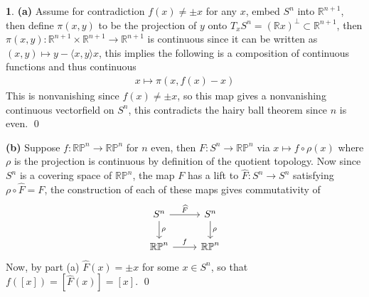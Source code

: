 \documentclass[10.5pt]{article}
\theoremstyle{definition}
\newtheorem{pb}{}
\newcommand{\gen}[1]{\langle#1\rangle}
\begin{document}
    \begin{pb}
        \textbf{(a)} Assume for contradiction \(f(x) \neq \pm x\) for any \(x\), embed \(S^n\) into \(\mathbb{R}^{n+1}\), then define \(\pi(x,y)\) to be the projection of \(y\) onto \(T_xS^n = (\mathbb{R} x)^{\perp} \subset \mathbb{R}^{n+1}\), then \(\pi(x,y) : \mathbb{R}^{n+1} \times \mathbb{R}^{n+1} \to \mathbb{R}^{n+1}\) is continuous since it can be written as \((x,y) \mapsto y - \gen{x,y}x\), this implies the following is a composition of continuous functions and thus continuous
        \begin{align*}
            x \mapsto \pi(x,f(x) - x)
        \end{align*}
        This is nonvanishing since \(f(x) \neq \pm x\), so this map gives a nonvanishing continuous vectorfield on \(S^n\), this contradicts the hairy ball theorem since \(n\) is even. \qed

        \textbf{(b)} Suppose \(f: \mathbb{RP}^n \to \mathbb{RP}^n\) for \(n\) even, then \(F: S^n \to \mathbb{RP}^n\) via \(x \mapsto f\circ\rho(x)\) where \(\rho\) is the projection is continuous by definition of the quotient topology. Now since \(S^n\) is a covering space of \(\mathbb{RP}^n\), the map \(F\) has a lift to \(\widehat{F}: S^n \to S^n\) satisfying \(\rho\circ \widehat{F} = F\), the construction of each of these maps gives commutativity of
        \begin{equation*}
            \begin{tikzcd}
                S^n \arrow[d,"\rho"] \arrow[r,"\widehat{F}"] & S^n \arrow[d,"\rho"] \\
                \mathbb{RP}^n \arrow[r,"f"] &\mathbb{RP}^n
            \end{tikzcd}
        \end{equation*}
        Now, by part (a) \(\widehat{F}(x) = \pm x\) for some \(x \in S^n\), so that \(f([x]) = [\widehat{F}(x)] = [x]\). \qed
    \end{pb}
\end{document}

